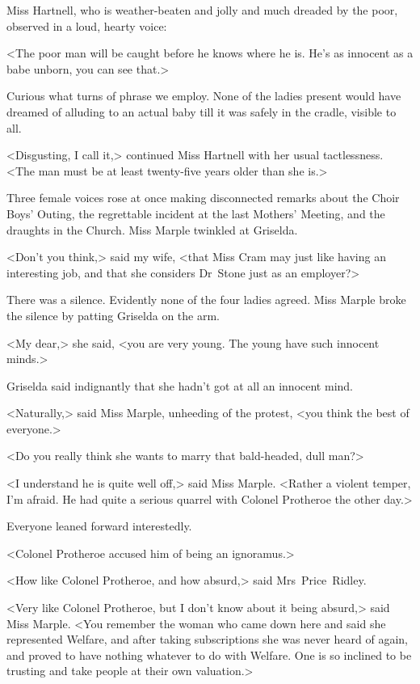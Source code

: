 Miss Hartnell, who is weather-beaten and jolly and much dreaded by the poor, observed in a loud, hearty voice:

<The poor man will be caught before he knows where he is. He's as innocent as a babe unborn, you can see that.>

Curious what turns of phrase we employ. None of the ladies present would have dreamed of alluding to an actual baby till it was safely in the cradle, visible to all.

<Disgusting, I call it,> continued Miss Hartnell with her usual tactlessness. <The man must be at least twenty-five years older than she is.>

Three female voices rose at once making disconnected remarks about the Choir Boys' Outing, the regrettable incident at the last Mothers' Meeting, and the draughts in the Church. Miss Marple twinkled at Griselda.

<Don't you think,> said my wife, <that Miss Cram may just like having an interesting job, and that she considers Dr~Stone just as an employer?>

There was a silence. Evidently none of the four ladies agreed. Miss Marple broke the silence by patting Griselda on the arm.

<My dear,> she said, <you are very young. The young have such innocent minds.>

Griselda said indignantly that she hadn't got at all an innocent mind.

<Naturally,> said Miss Marple, unheeding of the protest, <you think the best of everyone.>

<Do you really think she wants to marry that bald-headed, dull man?>

<I understand he is quite well off,> said Miss Marple. <Rather a violent temper, I'm afraid. He had quite a serious quarrel with Colonel Protheroe the other day.>

Everyone leaned forward interestedly.

<Colonel Protheroe accused him of being an ignoramus.>

<How like Colonel Protheroe, and how absurd,> said Mrs~Price~Ridley.

<Very like Colonel Protheroe, but I don't know about it being absurd,> said Miss Marple. <You remember the woman who came down here and said she represented Welfare, and after taking subscriptions she was never heard of again, and proved to have nothing whatever to do with Welfare. One is so inclined to be trusting and take people at their own valuation.>

